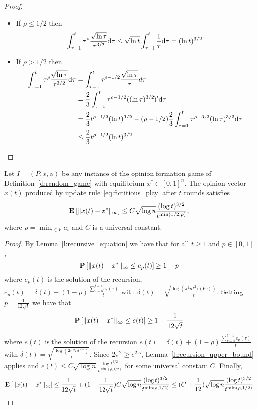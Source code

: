 \begin{proof}
  \begin{itemize}
    \item If
      $\rho\leq 1/2$ then
      \[
        \int_{\tau=1}^t \tau^\rho\frac{\sqrt{\ln \tau}}{\tau^{3/2}}\mathrm{d}\tau
        \leq
        \sqrt{\ln t }
        \int_{\tau=1}^t
        \frac{1}{\tau}\mathrm{d}\tau = (\ln t)^{3/2}
      \]
    \item If $\rho > 1/2$ then\\
      \begin{align*}
        \int_{\tau=1}^t
        \tau^\rho\frac{\sqrt{\ln \tau}}{\tau^{3/2}}\mathrm{d}\tau
        &=
        \int_{\tau=1}^t \tau^{\rho-1/2}\frac{\sqrt{\ln \tau}}{\tau}d\tau \\
        &=
        \frac{2}{3} \int_{\tau=1}^t
        \tau^{\rho-1/2}((\ln \tau)^{3/2})'\mathrm{d}\tau \\
        &=
        \frac{2}{3}t^{\rho - 1/2}(\ln t)^{3/2} - (\rho-1/2)\frac{2}{3}
        \int_{\tau=1}^t \tau^{\rho-3/2}(\ln \tau)^{3/2}\mathrm{d}\tau \\
        &\leq \frac{2}{3} t^{\rho - 1/2}(\ln t)^{3/2}
      \end{align*}
  \end{itemize}
\end{proof}

\begin{theorem}\label{thm:convergence}
  Let $I = (P,s, \alpha)$ be any instance of the opinion formation
  game of Definition~\ref{d:random_game} with equilibrium
  $x^* \in [0,1]^n$.  The opinion vector $x(t)$ produced by
  update rule~\ref{eq:fictitious_play}
  after $t$ rounds satisfies
  \[
    \bm{\mathrm{E}}_{} \left[ \| x(t) - x^* \|_{\infty} \right] \leq
    C \sqrt{\log n}\frac{(\log t)^{3/2}}{t^{\min(1/2,\rho)}},
  \]
  where $\rho = \min_{i \in V} a_i$ and $C$ is a universal constant.
\end{theorem}

\begin{proof}
By Lemma~\ref{l:recursive_equation} we have that for all $t\geq 1$ and $p \in [0,1]$,
\[\bm{\mathrm{P}}\left[\| x(t)-x^* \|_{\infty} \leq e_p(t)\right] \geq 1-p\]
where $e_p(t)$ is the solution of the recursion, $e_p(t) =\delta(t) + (1-\rho)\frac{\sum_{\tau=0}^{t-1}e_p(\tau)}{t}$ with
$\delta(t)=\sqrt{ \frac{\log(\pi^2 n t^2/(6 p))}{t}}$. Setting $p=\frac{1}{12\sqrt{t}}$ we have that
\[\bm{\mathrm{P}}\left[\| x(t)-x^* \|_{\infty} \leq e(t)\right] \geq 1-\frac{1}{12\sqrt{t}}\]
where $e(t)$ is the solution of the recursion $e(t) =\delta(t) + (1-\rho)\frac{\sum_{\tau=0}^{t-1}e_p(\tau)}{t}$ with
$\delta(t)=\sqrt{\frac{\log(2\pi^2 n t^{2.5})}{t}}$. Since $2\pi^2 \geq e^{2.5}$, Lemma~\ref{l:recursion_upper_bound} applies and
$e(t)\leq C\sqrt{\log n}\frac{\log t^{3/2}}{t^{\min(\rho,1/2)}}$ for some universal constant $C$. Finally,
\[\bm{\mathrm{E}}_{} \left[ \| x(t) - x^* \|_{\infty} \right] \leq \frac{1}{12\sqrt{t}} + (1-\frac{1}{12\sqrt{t}})C\sqrt{\log n}\frac{(\log t)^{3/2}}{t^{\min(\rho,1/2)}}
\leq (C+\frac{1}{12})\sqrt{\log n}\frac{(\log t)^{3/2}}{t^{\min(\rho,1/2)}}\]
\end{proof}
